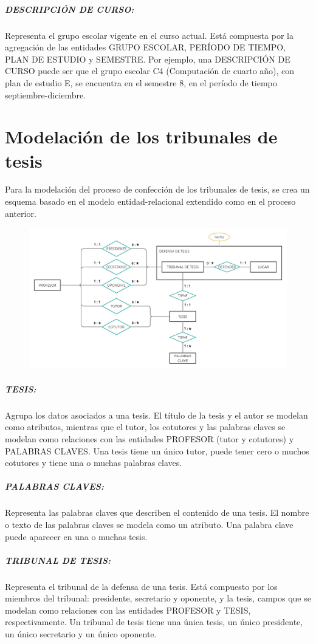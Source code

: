 \subparagraph{DESCRIPCIÓN DE CURSO:}
Representa el grupo escolar vigente en el curso actual. Está 
compuesta por la agregación de las entidades GRUPO ESCOLAR,
PERÍODO DE TIEMPO, PLAN DE ESTUDIO y SEMESTRE.  
Por ejemplo, una DESCRIPCIÓN DE CURSO puede ser 
que el grupo escolar C4 (Computación de cuarto año), con plan de
estudio E, se encuentra en el semestre 8,  en el período de tiempo septiembre-diciembre.






\section{Modelación de los tribunales de tesis}
Para la modelación del proceso de confección de los tribunales de tesis,
se crea un esquema basado en el modelo entidad-relacional extendido como en el 
proceso anterior. 


\begin{figure}[H]
    \includegraphics[scale=0.29]{Graphics/Database/MERXX-TC-FINAL.jpg}
\end{figure}


\subparagraph{TESIS:}
Agrupa los datos asociados a una tesis.
El título de la tesis y el autor se modelan como atributos, mientras que
el tutor, los cotutores y las palabras claves se modelan como relaciones con 
las entidades PROFESOR (tutor y cotutores) y PALABRAS CLAVES.
Una tesis tiene un único tutor, puede tener cero o muchos cotutores y tiene 
una o muchas palabras claves. 

\subparagraph{PALABRAS CLAVES:}
Representa las palabras claves que describen el contenido de una tesis.
El nombre o texto de las palabras claves se modela como un atributo. Una 
palabra clave puede aparecer en una o muchas tesis. 


\subparagraph{TRIBUNAL DE TESIS:}
Representa el tribunal de la defensa de una tesis.
Está compuesto por los miembros del tribunal: presidente, secretario y oponente, 
y la tesis, campos que se modelan como relaciones con las entidades PROFESOR y TESIS, respectivamente.
Un tribunal de tesis tiene una única tesis, un único presidente, un único secretario y 
un único oponente.


